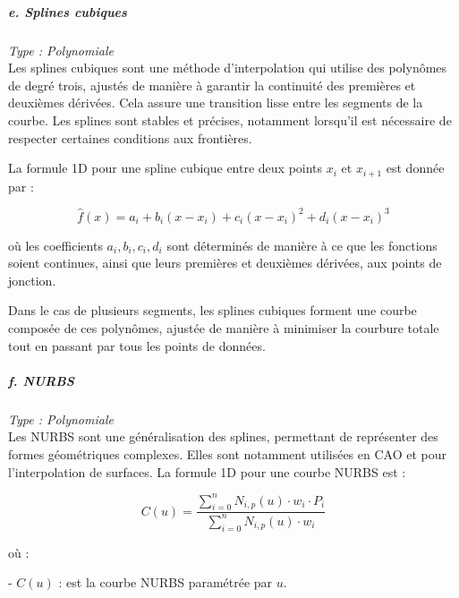 \subparagraph{e. Splines cubiques \cite{gordont1971}}
\textit{Type : Polynomiale} \\
\phantom{----}Les splines cubiques sont une méthode d'interpolation qui utilise des polynômes de degré trois, ajustés de manière à garantir la continuité des premières et deuxièmes dérivées. Cela assure une transition lisse entre les segments de la courbe. Les splines sont stables et précises, notamment lorsqu'il est nécessaire de respecter certaines conditions aux frontières.

La formule 1D pour une spline cubique entre deux points \( x_i \) et \( x_{i+1} \) est donnée par :

\vspace{-0,5 cm}

\begin{equation}
    \hat{f}(x) = a_i + b_i(x - x_i) + c_i(x - x_i)^2 + d_i(x - x_i)^3
\end{equation}

où les coefficients \( a_i, b_i, c_i, d_i \) sont déterminés de manière à ce que les fonctions soient continues, ainsi que leurs premières et deuxièmes dérivées, aux points de jonction.

Dans le cas de plusieurs segments, les splines cubiques forment une courbe composée de ces polynômes, ajustée de manière à minimiser la courbure totale tout en passant par tous les points de données.

\newpage

\subparagraph{f. NURBS \cite{surface, piegl1995nurbs}}
\textit{Type : Polynomiale} \\
\phantom{----}Les \ac{NURBS} sont une généralisation des splines, permettant de représenter des formes géométriques complexes. Elles sont notamment utilisées en CAO et pour l'interpolation de surfaces.
La formule 1D pour une courbe NURBS est :

\vspace{-0,6 cm}

\begin{equation}
    C(u) = \frac{\sum_{i=0}^{n} N_{i,p}(u) \cdot w_i \cdot P_i}{\sum_{i=0}^{n} N_{i,p}(u) \cdot w_i}
\end{equation}

\vspace{-0,4 cm}

où :

- \( C(u) \) : est la courbe NURBS paramétrée par \( u \).

\vspace{-0,2 cm}

